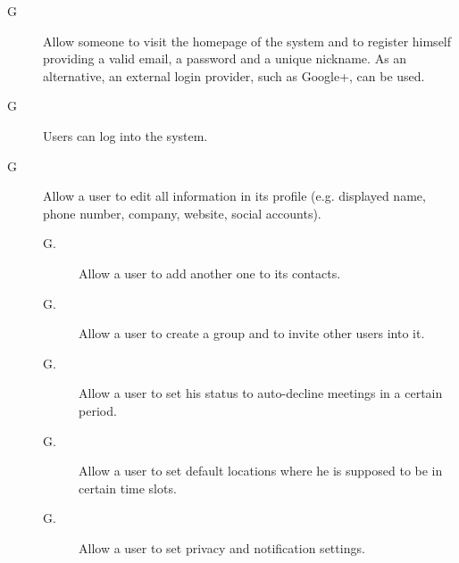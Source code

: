 
\begin{description}
\item[G\thecount\label{itm:G1}] Allow someone to visit the homepage of the system and to register himself providing a valid email, a password and a unique nickname. As an alternative, an external login provider, such as Google+, can be used.

\setcounter{countin}{1}

\item[G\thecount] Users can log into the system.

\setcounter{countin}{1}

\item[G\thecount] Allow a user to edit all information in its profile (e.g. displayed name, phone number, company, website, social accounts).
\begin{description}
\item[G\thecount.\thecountin] Allow a user to add another one to its contacts.
\item[G\thecount.\thecountin] Allow a user to create a group and to invite other users into it.
\item[G\thecount.\thecountin] Allow a user to set his status to auto-decline meetings in a certain period.
\item[G\thecount.\thecountin] Allow a user to set default locations where he is supposed to be in certain time slots.
\item[G\thecount.\thecountin] Allow a user to set privacy and notification settings.
\end{description}

\setcounter{countin}{1}


\end{description}
